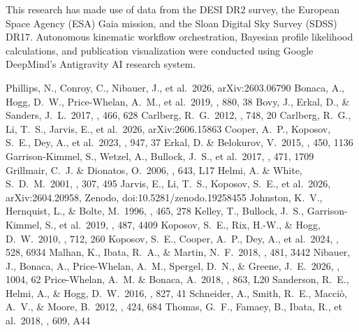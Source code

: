 \documentclass[twocolumn]{aastex631}
\begin{document}
\begin{acknowledgments}
This research has made use of data from the DESI DR2 survey, the European Space Agency (ESA) Gaia mission, and the Sloan Digital Sky Survey (SDSS) DR17. Autonomous kinematic workflow orchestration, Bayesian profile likelihood calculations, and publication visualization were conducted using Google DeepMind's Antigravity AI research system.
\end{acknowledgments}


\begin{thebibliography}{}
 Phillips, N., Conroy, C., Nibauer, J., et al.\ 2026, arXiv:2603.06790
 Bonaca, A., Hogg, D.~W., Price-Whelan, A.~M., et al.\ 2019, \apj, 880, 38
 Bovy, J., Erkal, D., \& Sanders, J.~L.\ 2017, \mnras, 466, 628
 Carlberg, R.~G.\ 2012, \apj, 748, 20
 Carlberg, R.~G., Li, T.~S., Jarvis, E., et al.\ 2026, arXiv:2606.15863
 Cooper, A.~P., Koposov, S.~E., Dey, A., et al.\ 2023, \apj, 947, 37
 Erkal, D. \& Belokurov, V.\ 2015, \mnras, 450, 1136
 Garrison-Kimmel, S., Wetzel, A., Bullock, J.~S., et al.\ 2017, \mnras, 471, 1709
 Grillmair, C.~J. \& Dionatos, O.\ 2006, \apjl, 643, L17
 Helmi, A. \& White, S.~D.~M.\ 2001, \mnras, 307, 495
 Jarvis, E., Li, T.~S., Koposov, S.~E., et al.\ 2026, arXiv:2604.20958, Zenodo, doi:10.5281/zenodo.19258455
 Johnston, K.~V., Hernquist, L., \& Bolte, M.\ 1996, \apj, 465, 278
 Kelley, T., Bullock, J.~S., Garrison-Kimmel, S., et al.\ 2019, \mnras, 487, 4409
 Koposov, S.~E., Rix, H.-W., \& Hogg, D.~W.\ 2010, \apj, 712, 260
 Koposov, S.~E., Cooper, A.~P., Dey, A., et al.\ 2024, \mnras, 528, 6934
 Malhan, K., Ibata, R.~A., \& Martin, N.~F.\ 2018, \mnras, 481, 3442
 Nibauer, J., Bonaca, A., Price-Whelan, A.~M., Spergel, D.~N., \& Greene, J.~E.\ 2026, \apj, 1004, 62
 Price-Whelan, A.~M. \& Bonaca, A.\ 2018, \apjl, 863, L20
 Sanderson, R.~E., Helmi, A., \& Hogg, D.~W.\ 2016, \apj, 827, 41
 Schneider, A., Smith, R.~E., Macci{\`o}, A.~V., \& Moore, B.\ 2012, \mnras, 424, 684
 Thomas, G.~F., Famaey, B., Ibata, R., et al.\ 2018, \aap, 609, A44
\end{thebibliography}
\end{document}
